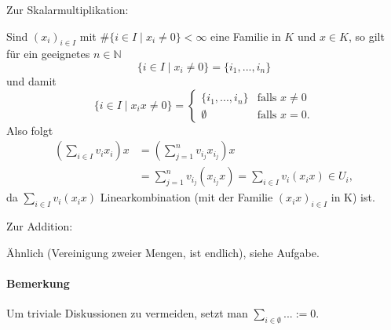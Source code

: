 Zur Skalarmultiplikation:
        \begin{addmargin}[25pt]{0pt}
	Sind $(x_i)_{i\in I}$ mit $\#\{i\in I \mid x_i \neq 0\}<\infty$ eine Familie in $ K $ und $x\in K$, so gilt für ein geeignetes $n\in \mathbb{N}$
		\[ \{i\in I\mid x_i \neq 0\} = \{i_1, ... , i_n\} \]
	und damit
	\begin{equation*}
		\{i\in I\mid x_ix\neq 0\} =
		\begin{cases}
			\{{i_1,...,i_n\}}& \text{falls }x \neq 0\\
			\emptyset& \text{falls }x = 0.
		\end{cases}
	\end{equation*}
	Also folgt
	\begin{align*}
		(\sum_{i\in I}v_i x_i) x &= (\sum_{j=1}^{n} v_{i_j}x_{i_j})x\\
		&= \sum_{j=1}^{n} v_{i_j}(x_{i_j}x) = \sum_{i\in I} v_i(x_ix) \in U_i,
	\end{align*}
	da $\sum_{i\in I} v_i(x_ix)$ Linearkombination (mit der Familie $(x_ix)_{i\in I}$ in K) ist.
	\end{addmargin}

Zur Addition:
        \begin{addmargin}[25pt]{0pt}
            Ähnlich (Vereinigung zweier Mengen, ist endlich), siehe Aufgabe.
	\end{addmargin}
	
\paragraph{Bemerkung}
	Um triviale Diskussionen zu vermeiden, setzt man $\sum_{i\in \emptyset} ...:=0$.
